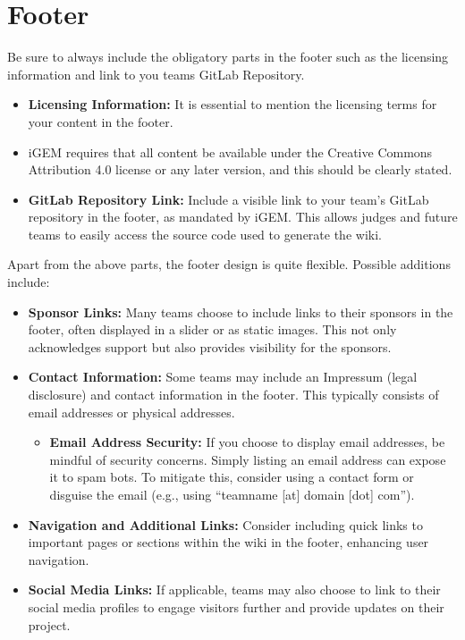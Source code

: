 \section{Footer}
Be sure to always include the obligatory parts in the footer such as the licensing information and link to you teams GitLab Repository.
\begin{itemize}
    \item \textbf{Licensing Information:} 
    It is essential to mention the licensing terms for your content in the footer.
    \item iGEM requires that all content be available under the Creative Commons Attribution 4.0 license or any later version, and this should be clearly stated.

    \item \textbf{GitLab Repository Link:}
    Include a visible link to your team’s GitLab repository in the footer, as mandated by iGEM. This allows judges and future teams to easily access the source code used to generate the wiki.
\end{itemize}
Apart from the above parts, the footer design is quite flexible.
Possible additions include:
\begin{itemize}
    \item \textbf{Sponsor Links:} 
    Many teams choose to include links to their sponsors in the footer, often displayed in a slider or as static images.
    This not only acknowledges support but also provides visibility for the sponsors.

    \item \textbf{Contact Information:}
    Some teams may include an Impressum (legal disclosure) and contact information in the footer.
    This typically consists of email addresses or physical addresses.
    \begin{itemize}
        \item \textbf{Email Address Security:}
        If you choose to display email addresses, be mindful of security concerns.
        Simply listing an email address can expose it to spam bots.
        To mitigate this, consider using a contact form or disguise the email (e.g., using ``teamname [at] domain [dot] com'').
    \end{itemize}



    \item \textbf{Navigation and Additional Links:}
    Consider including quick links to important pages or sections within the wiki in the footer, enhancing user navigation.

    \item \textbf{Social Media Links:}
    If applicable, teams may also choose to link to their social media profiles to engage visitors further and provide updates on their project.

\end{itemize}
